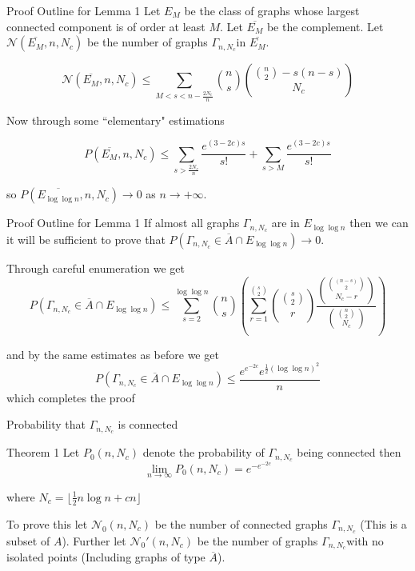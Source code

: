 \documentclass{beamer}
\begin{document}
\begin{frame}{Proof Outline for Lemma 1}
	Let $E_M$ be the class of graphs whose largest connected component is of order at least $M$. Let $\overline{E_M}$ be the complement. Let $\mathcal{N}(\overline{E_M},n,N_c)$ be the number of graphs $\Gamma_{n,N_c}$in  $\overline{E_M}$. 
	
	$$\mathcal{N}(\overline{E_M},n,N_c)\leq \sum_{M<s<n-\frac{2N_c}{n}}{n\choose s}{{n\choose 2}-s(n-s)\choose N_c} $$
	
	Now through some ``elementary" estimations
	
	$$P(\overline{E_M},n,N_c)\leq \sum_{s>\frac{2N_c}{n}}\frac{e^{(3-2c)s}}{s!}+\sum_{s>M}\frac{e^{(3-2c)s}}{s!}$$
	 
	so $P(\overline{E_{\log\log n}},n,N_c)\rightarrow 0 $ as $n\rightarrow +\infty$. 
\end{frame}

\begin{frame}{Proof Outline for Lemma 1}
	If almost all graphs $\Gamma_{n,N_c}$ are in $E_{\log\log n}$ then we can it will be sufficient to prove that $P(\Gamma_{n,N_c}\in \overline{A}\cap E_{\log\log n})\rightarrow 0 $. 
	
	Through careful enumeration we get 
	$$P(\Gamma_{n,N_c}\in \overline{A}\cap E_{\log\log n})\leq \sum_{s=2}^{\log\log n} {n\choose s}\left(\sum_{r=1}^{s\choose 2}{{s\choose 2}\choose r}\frac{{{(n-s)\choose 2}\choose N_c-r}}{{{n\choose 2}\choose N_c}}\right)$$
	
	and by the same estimates as before we get
	$$P(\Gamma_{n,N_c}\in \overline{A}\cap E_{\log\log n})\leq\frac{e^{e^{-2c}}e^{\frac{1}{2}(\log\log n)^2}}{n}$$
	which completes the proof
\end{frame}


\begin{frame}{Probability that $\Gamma_{n,N_c}$ is connected}
	\begin{block}{Theorem 1}
		Let $P_0(n,N_c)$ denote the probability of $\Gamma_{n,N_c}$ being connected then
		$$\lim_{n\rightarrow \infty}P_0(n,N_c)=e^{-e^{-2c}}$$
		
		where $N_c=\lfloor \frac{1}{2}n\log n+ cn\rfloor$
	\end{block}
	To prove this let $\mathcal{N}_0(n,N_c)$ be the number of connected graphs $\Gamma_{n,N_c}$ (This is a subset of $A$). Further let $\mathcal{N}_0'(n,N_c)$ be the number of graphs $\Gamma_{n,N_c}$with no isolated points (Including graphs of type $\overline{A}$).
\end{frame}
\end{document}
